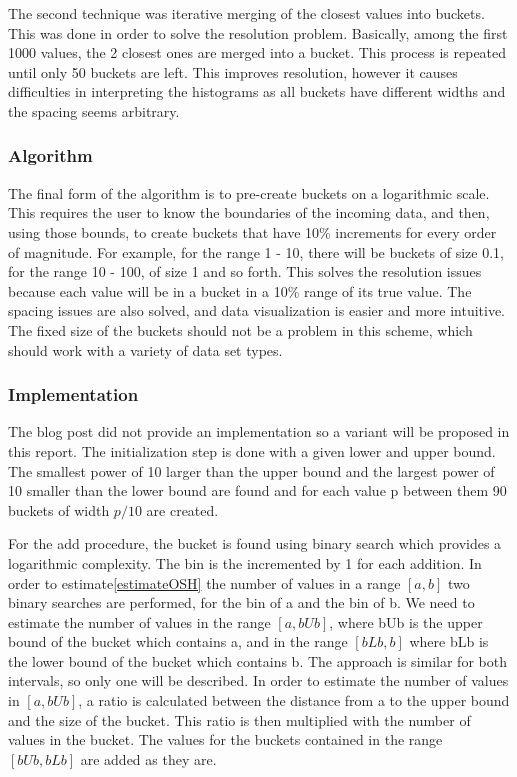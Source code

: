 \documentclass[12pt]{article}
\begin{document}
	The second technique was iterative merging of the closest values into buckets. 
	This was done in order to solve the resolution problem. Basically, among the 
	first 1000 values, the 2 closest ones are merged into a bucket. This process 
	is repeated until only 50 buckets are left. This improves resolution, however 
	it causes difficulties in interpreting the histograms as all buckets have 
	different widths and the spacing seems arbitrary. 

	\subsubsection{Algorithm}
	The final form of the algorithm is to pre-create buckets on a logarithmic 
	scale. This requires the user to know the boundaries of the incoming data, 
	and then, using those bounds, to create buckets that have 10\% increments 
	for every order of magnitude. For example, for the range 1 - 10, there will be 
	buckets of size 0.1, for the range 10 - 100, of size 1 and so forth. This solves
	the resolution issues because each value will be in a bucket in a 10\% range 
	of its true value. The spacing issues are also solved, and data visualization
	is easier and more intuitive. The fixed size of the buckets should not be a 
	problem in this scheme, which should work with a variety of data set types.

	\subsubsection{Implementation}
	The blog post did not provide an implementation so a variant will be 
	proposed in this report. The initialization step is done with a given 
	lower and upper bound. The smallest power of 10 larger than the upper bound 
	and the largest power of 10 smaller than the lower bound are found and 
	for each value p between them 90 buckets of width $p / 10$ are created.

	For the add procedure, the bucket is found using binary search which 
	provides a logarithmic complexity. The bin is the incremented by 1 
	for each addition. In order to estimate\ref{estimateOSH} the number of values in a range $ [a, b] $ 
	two binary searches are performed, for the bin of a and the bin of b. We 
	need to estimate the number of values in the range $[a, bUb]$, where bUb is the upper
	bound of the bucket which contains a, and in the range $[bLb, b]$ where bLb is the
	lower bound of the bucket which contains b. The approach is similar for both 
	intervals, so only one will be described. In order to estimate the number 
	of values in $[a, bUb]$, a ratio is calculated between the distance from 
	a to the upper bound and the size of the bucket. This ratio is then multiplied 
	with the number of values in the bucket. The values for the buckets contained 
	in the range $ [bUb, bLb] $ are added as they are.
	
\end{document}
